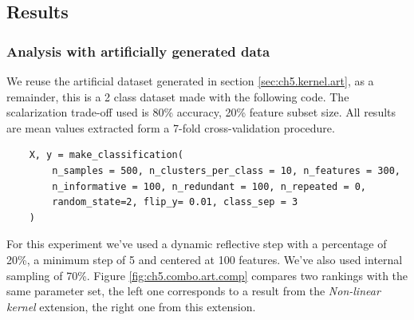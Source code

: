 \subsection{Results}

\subsubsection*{Analysis with artificially generated data}

We reuse the artificial dataset generated in section \ref{sec:ch5.kernel.art}, as a remainder, this is a 2 class dataset made with the following code.  The scalarization trade-off used is 80\% accuracy, 20\% feature subset size. All results are mean values extracted form a 7-fold cross-validation procedure.

\begin{verbatim}
    X, y = make_classification(
        n_samples = 500, n_clusters_per_class = 10, n_features = 300, 
        n_informative = 100, n_redundant = 100, n_repeated = 0,
        random_state=2, flip_y= 0.01, class_sep = 3
    )
\end{verbatim}

For this experiment we've used a dynamic reflective step with a percentage of 20\%, a minimum step of 5 and centered at 100 features. We've also used internal sampling of 70\%. Figure \ref{fig:ch5.combo.art.comp} compares two rankings with the same parameter set, the left one corresponds to a result from the \emph{Non-linear kernel} extension, the right one from this extension.  

